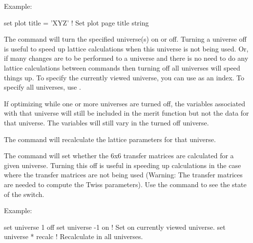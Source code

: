 {{\begin{description}
Example:
\begin{example}
  set plot title = 'XYZ'  ! Set plot page title string
\end{example}


\item[\protect\parbox{6in}{
        set universe <what\_universe> on/off \\ 
        set universe <what\_universe> recalculate \\
        set universe <what\_universe> mat6\_recalc on/off}] \Newline
The  command will turn the
specified universe(s) on or off. Turning a universe off is useful to
speed up lattice calculations when this universe is not being
used. Or, if many changes are to be performed to a universe and there
is no need to do any lattice calculations between commands then
turning off all universes will speed things up. To specify the
currently viewed universe, you can use  as an index.  To
specify all universes, use \vn{*}.

If optimizing while one or more universes are turned off, the
variables associated with that universe will still be included in the
merit function but not the data for that universe. The variables will
still vary in the turned off universe.

The  command will recalculate the
lattice parameters for that universe.

The  command will set whether
the 6x6 transfer matrices are calculated for a given universe. Turning
this off is useful in speeding up calculations in the case where the
transfer matrices are not being used (Warning: The transfer matrices
are needed to compute the Twiss parameters). Use the  command to see the state of the  switch.

Example:
\begin{example}
  set universe 1 off
  set universe -1 on    ! Set on currently viewed universe.
  set universe * recalc ! Recalculate in all universes.
\end{example}



\end{description}}}
